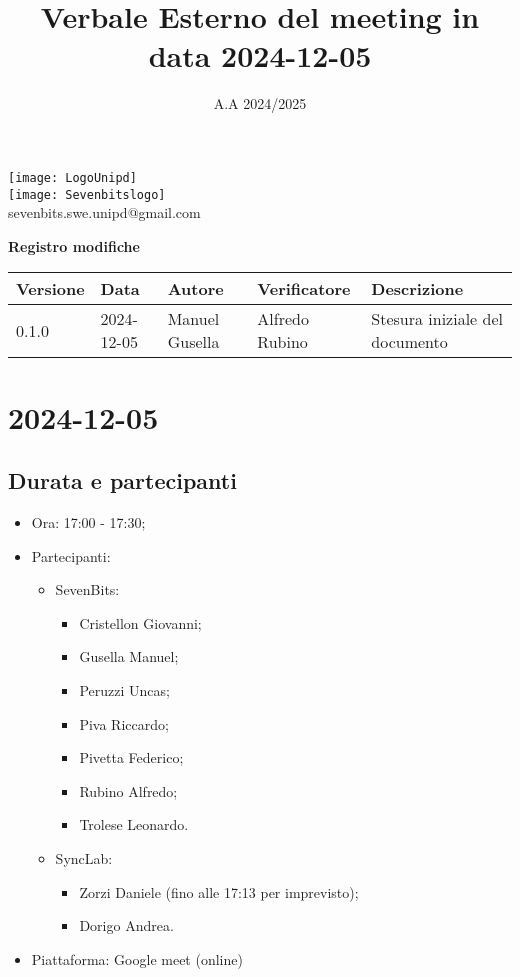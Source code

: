 \documentclass[12pt]{article}
\title{Verbale Esterno del meeting in data 2024-12-05}
\date{A.A 2024/2025}
\begin{document}
\maketitle
\begin{center}
\texttt{[image: LogoUnipd]}\\
\texttt{[image: Sevenbitslogo]}\\
sevenbits.swe.unipd@gmail.com\\
\vspace{2mm}

\textbf{Registro modifiche}\\
\vspace{2mm}
\begin{tabularx}{\textwidth}{|l|l|l|l|X|}
\hline
\textbf{Versione} & \textbf{Data} & \textbf{Autore} & \textbf{Verificatore} & \textbf{Descrizione} \\
\hline
0.1.0 & 2024-12-05 & Manuel Gusella & Alfredo Rubino & Stesura iniziale del documento\\
\hline

\end{tabularx}
\end{center}
\newpage
\tableofcontents
\newpage
\section{2024-12-05}
\subsection{Durata e partecipanti}
\begin{itemize}
\item Ora: 17:00 - 17:30;
\item Partecipanti: 	
	\begin{itemize}
        \item SevenBits:
        \begin{itemize}
        		\item Cristellon Giovanni;
			\item Gusella Manuel;
			\item Peruzzi Uncas;
			\item Piva Riccardo;
			\item Pivetta Federico;
			\item Rubino Alfredo;
			\item Trolese Leonardo.
		\end{itemize}
		\item SyncLab:
		\begin{itemize}
			\item Zorzi Daniele (fino alle 17:13 per imprevisto);
			\item Dorigo Andrea.
		\end{itemize}
	\end{itemize}
\item Piattaforma: Google meet (online)
\end{itemize}
\end{document}
